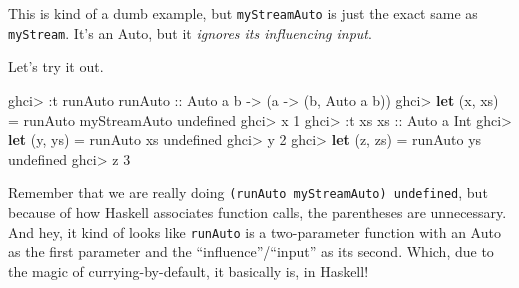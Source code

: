 \documentclass[]{article}
\newenvironment{Shaded}{}{}
\newcommand{\CommentTok}[1]{\textcolor[rgb]{0.38,0.63,0.69}{\textit{#1}}}
\newcommand{\DataTypeTok}[1]{\textcolor[rgb]{0.56,0.13,0.00}{#1}}
\newcommand{\DecValTok}[1]{\textcolor[rgb]{0.25,0.63,0.44}{#1}}
\newcommand{\FunctionTok}[1]{\textcolor[rgb]{0.02,0.16,0.49}{#1}}
\newcommand{\KeywordTok}[1]{\textcolor[rgb]{0.00,0.44,0.13}{\textbf{#1}}}
\newcommand{\NormalTok}[1]{#1}
\newcommand{\OtherTok}[1]{\textcolor[rgb]{0.00,0.44,0.13}{#1}}
\begin{document}
\begin{Shaded}
\end{Shaded}

This is kind of a dumb example, but \texttt{myStreamAuto} is just the exact same
as \texttt{myStream}. It's an Auto, but it \emph{ignores its influencing input}.

Let's try it out.

\begin{Shaded}
\begin{Highlighting}[]
\NormalTok{ghci}\FunctionTok{>} \FunctionTok{:}\NormalTok{t runAuto}
\OtherTok{runAuto ::} \DataTypeTok{Auto}\NormalTok{ a b }\OtherTok{->}\NormalTok{ (a }\OtherTok{->}\NormalTok{ (b, }\DataTypeTok{Auto}\NormalTok{ a b))}
\NormalTok{ghci}\FunctionTok{>} \KeywordTok{let}\NormalTok{ (x, xs) }\FunctionTok{=}\NormalTok{ runAuto myStreamAuto undefined}
\NormalTok{ghci}\FunctionTok{>}\NormalTok{ x}
\DecValTok{1}
\NormalTok{ghci}\FunctionTok{>} \FunctionTok{:}\NormalTok{t xs}
\OtherTok{xs ::} \DataTypeTok{Auto}\NormalTok{ a }\DataTypeTok{Int}
\NormalTok{ghci}\FunctionTok{>} \KeywordTok{let}\NormalTok{ (y, ys) }\FunctionTok{=}\NormalTok{ runAuto xs undefined}
\NormalTok{ghci}\FunctionTok{>}\NormalTok{ y}
\DecValTok{2}
\NormalTok{ghci}\FunctionTok{>} \KeywordTok{let}\NormalTok{ (z, zs) }\FunctionTok{=}\NormalTok{ runAuto ys undefined}
\NormalTok{ghci}\FunctionTok{>}\NormalTok{ z}
\DecValTok{3}
\end{Highlighting}
\end{Shaded}

Remember that we are really doing \texttt{(runAuto\ myStreamAuto)\ undefined},
but because of how Haskell associates function calls, the parentheses are
unnecessary. And hey, it kind of looks like \texttt{runAuto} is a two-parameter
function with an Auto as the first parameter and the ``influence''/``input'' as
its second. Which, due to the magic of currying-by-default, it basically is, in
Haskell!
\end{document}
